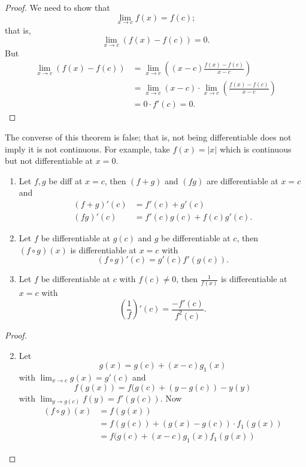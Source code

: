 \begin{proof}
    We need to show that \[ \lim_{x \to c} f(x) = f(c); \] that is, \[ \lim_{x \to c} \left( f(x) - f(c) \right) = 0. \] But 
    \begin{align*}
        \lim_{x \to c} \left( f(x) - f(c) \right) &= \lim_{x \to c} \left( (x - c) \frac{f(x) - f(c)}{x - c} \right) \\
        &= \lim_{x \to c} (x - c) \cdot \lim_{x \to c} \left( \frac{f(x) - f(c)}{x - c} \right) \\
        &= 0 \cdot f'(c) = 0.
    \end{align*}
\end{proof}

\begin{remark}
    The converse of this theorem is false; that is, not being differentiable does not imply it is not continuous. For example, take $f(x) = |x|$ which is continuous but not differentiable at $x = 0$.
\end{remark}

\begin{theorem}
    \begin{enumerate}
        \item Let $f, g$ be diff at $x = c$, then $(f + g)$ and $(f g)$ are differentiable at $x = c$ and 
        \begin{align*}
            (f + g)'(c) &= f'(c) + g'(c) \\
            (f g)'(c) &= f'(c) g(c) + f(c) g'(c).
        \end{align*}
        
        \item Let $f$ be differentiable at $g(c)$ and $g$ be differentiable at $c$, then $(f \circ g)(x)$ is differentiable at $x = c$ with \[ (f \circ g)'(c) = g'(c) f'(g(c)). \]
        
        \item Let $f$ be differentiable at $c$ with $f(c) \neq 0$, then $\frac{1}{f(x)}$ is differentiable at $x = c$ with \[ \left(\frac{1}{f}\right)'(c) = \frac{-f'(c)}{f^2(c)}. \]
    \end{enumerate}
\end{theorem}

\begin{proof}
    \begin{enumerate}
        \setcounter{enumi}{1}
        \item Let \[ g(x) = g(c) + (x - c) g_1(x) \tag{1} \] with $\lim_{x \to c} g(x) = g'(c)$ and \[ f(g(x)) = f(g(c) + (y - g(c)) - y(y) \tag{2} \] with $\lim_{y \to g(c)} f(y) = f'(g(c))$. Now
        \begin{align*}
            (f \circ g)(x) &= f(g(x)) \\
            &= f(g(c)) + (g(x) - g(c)) \cdot f_1(g(x)) \tag{by 2} \\
            &= f(g(c) + (x - c) g_1(x) f_1(g(x)) \tag{by 1}
        \end{align*}
    \end{enumerate}
\end{proof}

